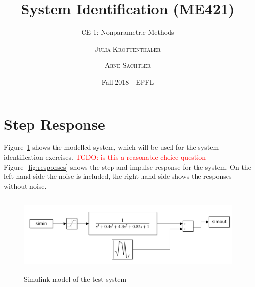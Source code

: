 \documentclass{scrartcl}
\title{System Identification (ME421)}
\subtitle{CE-1: Nonparametric Methods}
\author{\textsc{Julia Krottenthaler} \and \textsc{Arne Sachtler}}
\date{Fall 2018 - EPFL}
\begin{document}
\maketitle
\tableofcontents

\section{Step Response}

Figure~\ref{fig:testmodel} shows the modelled system, which will be used for the system identification exercises.
\textcolor{red}{TODO: is this a reasonable choice question}
Figure~\ref{fig:responses} shows the step and impulse response for the system. On the left hand side the noise is included, the right hand side shows the responses without noise.

\begin{figure}[h]
	\centering
	\includegraphics[height=4cm]{figures/systemmodel.png}
	\caption{Simulink model of the test system}\label{fig:testmodel}
\end{figure}
\end{document}
